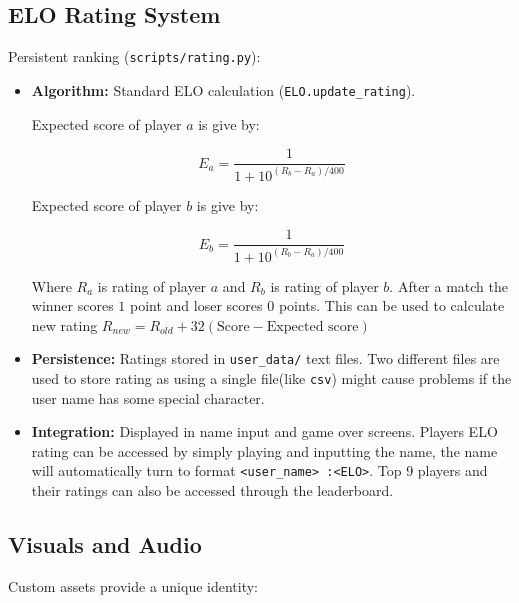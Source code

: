 \documentclass[11pt, a4paper]{article}
\begin{document}
\subsection{ELO Rating System}

Persistent ranking (\texttt{scripts/rating.py}):

\begin{itemize}

    \item \textbf{Algorithm:} Standard ELO calculation (\texttt{ELO.update\_rating}).

    Expected score of player $a$ is give by:

    \[E_a = \frac{1}{1+10^{(R_b-R_a)/400}}\]

    Expected score of player $b$ is give by:

    \[E_b = \frac{1}{1+10^{(R_b-R_a)/400}}\]

    Where $R_a$ is rating of player $a$ and $R_b$ is rating of player $b$.
    After a match the winner scores $1$ point and loser scores $0$ points.
    This can be used to calculate new rating $R_{new} = R_{old} + 32(\text{Score}-\text{Expected score})$
    
    \item \textbf{Persistence:} Ratings stored in \texttt{user\_data/} text files. Two different files are used to store rating as using a single file(like \texttt{csv}) might cause problems if the user name has some special character.
    
    \item \textbf{Integration:} Displayed in name input and game over screens. Players ELO rating can be accessed by simply playing and inputting the name, the name will automatically turn to format \texttt{<user\_name> :<ELO>}. Top 9 players and their ratings can also be accessed through the leaderboard.

\end{itemize}

\subsection{Visuals and Audio}

Custom assets provide a unique identity:
\end{document}

